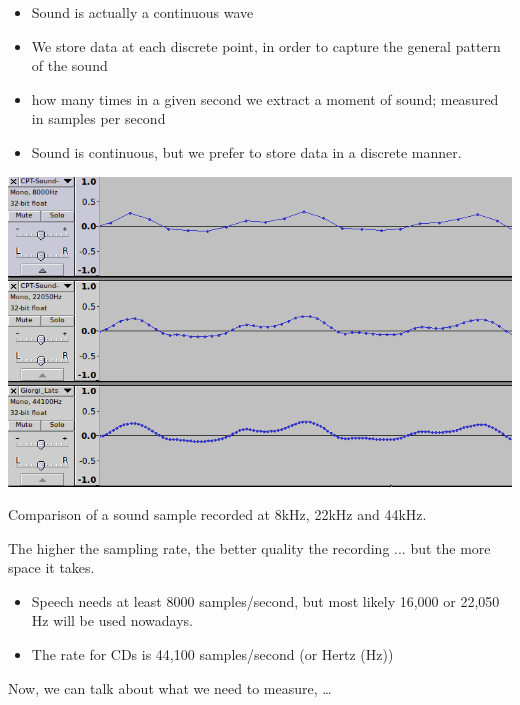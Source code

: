 \documentclass[a4paper,landscape,headrule,footrule,xetex]{foils}
\begin{document}
\begin{itemize}
\item Sound is actually a continuous wave
\item We store data at each discrete point, in order to capture the general pattern of the sound
\item {} how many times in a given second we extract a moment of sound; measured in samples per second
\item Sound is continuous, but we prefer to store data in a discrete manner.
\end{itemize}

\includegraphics[height=0.9\textheight]{../pics/CPT-Sound-SampleRate-3way-Comparison.png}

Comparison of a sound sample recorded at 8kHz, 22kHz and 44kHz.



The higher the sampling rate, the better quality the recording ... but the more space it takes. 

\begin{itemize}
\item Speech needs at least 8000 samples/second, but most likely 16,000 or 22,050 Hz will be used nowadays.
\item The rate for CDs is 44,100 samples/second (or Hertz (Hz))
\end{itemize}
Now, we can talk about what we need to measure, \ldots
\end{document}
